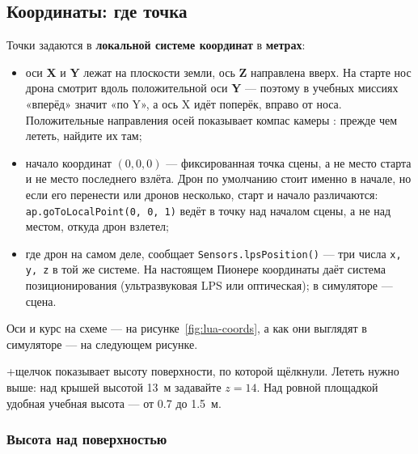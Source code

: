 \subsection{Координаты: где точка}

Точки задаются в \textbf{локальной системе координат} в \textbf{метрах}:
\begin{itemize}
    \item оси \textbf{X} и \textbf{Y} лежат на плоскости земли, ось \textbf{Z} направлена вверх. На старте нос дрона смотрит вдоль положительной оси \textbf{Y} --- поэтому в учебных миссиях «вперёд» значит «по Y», а ось X идёт поперёк, вправо от носа. Положительные направления осей показывает компас камеры : прежде чем лететь, найдите их там;
    \item начало координат $(0, 0, 0)$ --- фиксированная точка сцены, а не место старта и не место последнего взлёта. Дрон по умолчанию стоит именно в начале, но если его перенести или дронов несколько, старт и начало различаются: \verb|ap.goToLocalPoint(0, 0, 1)| ведёт в точку над началом сцены, а не над местом, откуда дрон взлетел;
    \item где дрон на самом деле, сообщает \verb|Sensors.lpsPosition()| --- три числа \verb|x, y, z| в той же системе. На настоящем Пионере координаты даёт система позиционирования (ультразвуковая LPS или оптическая); в симуляторе --- сцена.
\end{itemize}

Оси и курс на схеме --- на рисунке~\ref{fig:lua-coords}, а как они выглядят в симуляторе --- на следующем рисунке.



\begin{center}
\end{center}

\begin{hintbox}
+щелчок показывает высоту поверхности, по которой щёлкнули. Лететь нужно выше: над крышей высотой 13~м задавайте $z = 14$. Над ровной площадкой удобная учебная высота --- от 0.7 до 1.5~м.
\end{hintbox}

\subsubsection*{Высота над поверхностью}

